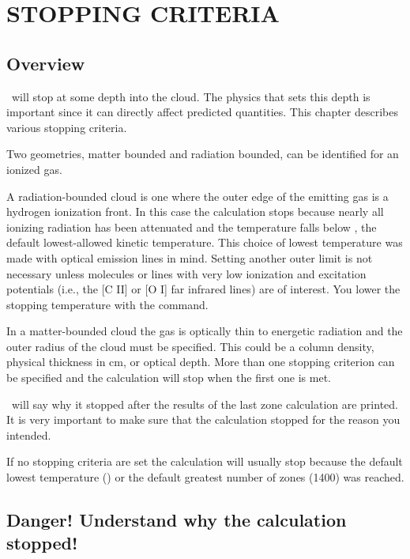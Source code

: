 \chapter{STOPPING CRITERIA}
\label{sec:StoppingCriteria}

\section{Overview}

\Cloudy\ will stop at some depth into the cloud.
The physics that sets
this depth is important since it can directly affect predicted quantities.
This chapter describes various stopping criteria.

Two geometries, matter bounded and radiation bounded, can be identified
for an ionized gas.

A radiation-bounded cloud is one where the outer edge of the emitting
gas is a hydrogen ionization front.
In this case the calculation stops
because nearly all ionizing radiation has been attenuated and the temperature
falls below \TEMPSTOPDEFAULT, the default lowest-allowed kinetic temperature.
This
choice of lowest temperature was made with optical emission lines in mind.
Setting another outer limit is not necessary unless molecules or lines with
very low ionization and excitation potentials (i.e., the [C II] or [O I]
far infrared lines) are of interest.
You lower
the stopping temperature with the  command.

In a matter-bounded cloud the gas is optically thin to energetic radiation
and the outer radius of the cloud must be specified.
This could be a column
density, physical thickness in cm, or optical depth.
More than one stopping
criterion can be specified and the calculation will stop when the first
one is met.

\Cloudy\ will say why it stopped after the results of the last zone
calculation are printed.
It is very important to make sure that the
calculation stopped for the reason you intended.

If no stopping criteria are set the calculation will usually stop because
the default lowest temperature (\TEMPSTOPDEFAULT) or the default greatest number of
zones (1400) was reached.

\section{Danger!  Understand why the calculation stopped!}

